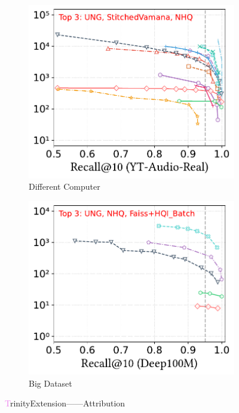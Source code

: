 \documentclass[sigconf, nonacm]{acmart}
\begin{document}
\begin{figure}[t]
\begin{subfigure}[t]{0.315\columnwidth}
			\includegraphics[width=\linewidth]{figures/exp/attribute_85.pdf}
			\caption{\footnotesize Different Computer}
			\label{fig:rangeFilter_index_size_mb}
		\end{subfigure}
		\hfill
		\begin{subfigure}[t]{0.315\columnwidth}
			\centering
			\includegraphics[width=\linewidth]{figures/exp/attribute_100M.pdf}
			\caption{\footnotesize Big Dataset}
			\label{fig:rangeFilter_build_memory_mb}
		\end{subfigure}

		
		\caption{\textcolor{violet}TrinityExtension——Attribution}
		\label{fig:TrinityExtension——Attribution}
	\end{figure}
	
\end{document}
